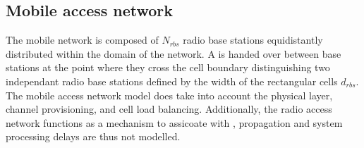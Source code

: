 \subsection{Mobile access network}
The mobile network is composed of $N_{rbs}$ radio base stations equidistantly distributed within the domain of the network. A \ue is handed over between base stations at the point where they cross the cell boundary distinguishing two independant radio base stations defined by the width of the rectangular cells $d_{rbs}$. The mobile access network model does take into account the physical layer, channel provisioning, and cell load balancing. Additionally, the radio access network functions as a mechanism to assicoate \ues with \dcs, propagation and system processing delays are thus not modelled.